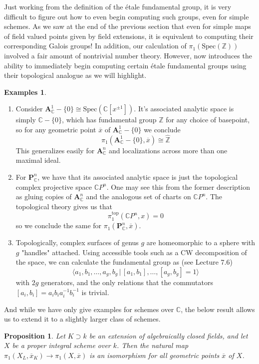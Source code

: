 \documentclass{article}
\theoremstyle{definition}
\newtheorem{examples}[theorem]{Examples}
\theoremstyle{remark}
\theoremstyle{plain}
\newtheorem{proposition}[theorem]{Proposition}
\newcommand{\C}{\mathbb{C}}
\newcommand{\Z}{\mathbb{Z}}
\begin{document}
Just working from the definition of the \'etale fundamental group, it is very difficult to figure out how to even begin computing such groups, even for simple schemes. 
As we saw at the end of the previous section that even for simple maps of field valued points given by field extensions, it is equivalent to computing their corresponding Galois groups!
In addition, our calculation of $\pi_1(\text{Spec}(\Z))$ involved a fair amount of nontrivial number theory.
However,  now introduces the ability to immediately begin computing certain \'etale fundamental groups using their topological analogue as we will highlight.

\begin{examples} \text{}
	\begin{enumerate} 	\item Consider $\textbf{A}_{\C}^1 - \{0\} \cong \text{Spec}(\C[x^{\pm 1}])$. 
		It's associated analytic space is simply $\C - \{0\}$, which has fundamental group $\Z$ for any choice of basepoint, so for any geometric point $\overline{x}$ of $\textbf{A}_{\C}^1 - \{0\}$ we conclude
		\[\pi_1(\textbf{A}_{\C}^1 - \{0\}, \overline{x}) \cong \widehat{\Z}\]
		This generalizes easily for $\textbf{A}_{\C}^n$  and localizations across more than one maximal ideal. 
		\item For $\textbf{P}_{\C}^n$, we have that its associated analytic space is just the topological complex projective space $\C P^n$.
	One may see this from the former description as gluing copies of $\textbf{A}_{\C}^n$ and the analogous set of charts on $\C P^n$.
	The topological theory gives us that 
	\[\pi_1^{\text{top}}(\C P^n, x) = 0\]
	so we conclude the same for $\pi_1(\textbf{P}_{\C}^n, \overline{x})$.
\item Topologically, complex surfaces of genus $g$ are homeomorphic to a sphere with $g$ "handles" attached.
	Using accessible tools such as a CW decomposition of the space, we can calculate the fundamental group as (see \cite{FomenkoFuchs} Lecture 7.6)
	\[\langle a_1, b_1, \dots, a_g, b_g \,|\, [a_1,b_1], \dots, [a_g,b_g] = 1\rangle \]
	with $2g$ generators, and the only relations that the commutators $[a_i, b_i] = a_i b_i a_i^{-1} b_i^{-1}$ is trivial.
\end{enumerate}
\end{examples}


And while we have only give examples for schemes over $\C$, the below result allows us to extend it to a slightly larger class of schemes. 
\begin{proposition}
	Let $K \supset k$ be an extension of algebraically closed fields, and let $X$ be a proper integral scheme over $k$.
	Then the natural map $\pi_1(X_L, \overline{x}_K) \to \pi_1(X, \overline{x})$ is an isomorphism for all geometric points $\overline{x}$ of $X$.
\end{proposition} 
\end{document}
